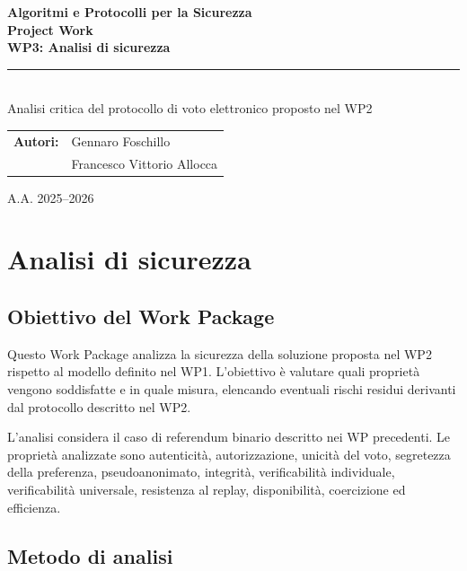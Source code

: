 \documentclass[a4paper,12pt]{article}
\begin{document}
\hypersetup{pageanchor=false}
\begin{titlepage}
    \centering
    \vspace*{1.7cm}
    {\Large\color{MainBlue}\textbf{Algoritmi e Protocolli per la Sicurezza}\\[0.4cm]}
    {\Huge\bfseries Project Work\\[0.25cm]}
    {\LARGE\bfseries WP3: Analisi di sicurezza\\[0.6cm]}
    \textcolor{MainBlue}{\rule{0.82\textwidth}{1.2pt}}\\[1.0cm]
    {\large Analisi critica del protocollo di voto elettronico proposto nel WP2}\\[2.2cm]
    \begin{tabular}{rl}
        \textbf{Autori:} & Gennaro Foschillo \\
                         & Francesco Vittorio Allocca \\
    \end{tabular}
    \vfill
    {\large A.A. 2025--2026}
\end{titlepage}

\hypersetup{pageanchor=true}
\tableofcontents
\newpage
{}

\section{ Analisi di sicurezza}

\subsection{Obiettivo del Work Package}

Questo Work Package analizza la sicurezza della soluzione proposta nel WP2 rispetto al modello definito nel WP1.
L'obiettivo è valutare quali proprietà vengono soddisfatte e in quale misura, elencando eventuali rischi residui derivanti dal protocollo descritto nel WP2.

L'analisi considera il caso di referendum binario descritto nei WP precedenti.
Le proprietà analizzate sono autenticità, autorizzazione, unicità del voto, segretezza della preferenza, pseudoanonimato, integrità, verificabilità individuale, verificabilità universale, resistenza al replay, disponibilità, coercizione ed efficienza.

\subsection{Metodo di analisi}
\end{document}

